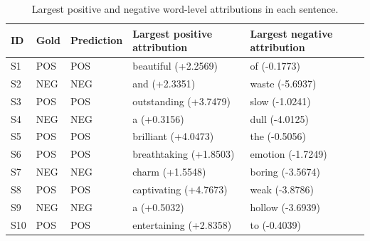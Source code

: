 \begin{table}[htbp]
\centering
\caption{Largest positive and negative word-level attributions in each sentence.}
\label{tab:topwords}
\begin{tabular}{lllll}
\toprule
ID & Gold & Prediction & Largest positive attribution & Largest negative attribution \\
\midrule
S1 & POS & POS & beautiful (+2.2569) & of (-0.1773) \\
S2 & NEG & NEG & and (+2.3351) & waste (-5.6937) \\
S3 & POS & POS & outstanding (+3.7479) & slow (-1.0241) \\
S4 & NEG & NEG & a (+0.3156) & dull (-4.0125) \\
S5 & POS & POS & brilliant (+4.0473) & the (-0.5056) \\
S6 & POS & POS & breathtaking (+1.8503) & emotion (-1.7249) \\
S7 & NEG & NEG & charm (+1.5548) & boring (-3.5674) \\
S8 & POS & POS & captivating (+4.7673) & weak (-3.8786) \\
S9 & NEG & NEG & a (+0.5032) & hollow (-3.6939) \\
S10 & POS & POS & entertaining (+2.8358) & to (-0.4039) \\
\bottomrule
\end{tabular}
\end{table}
